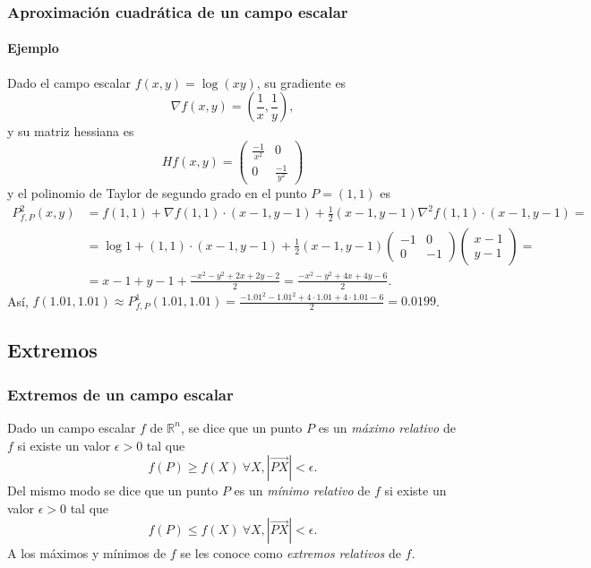 \begin{frame}
\frametitle{Aproximación cuadrática de un campo escalar}
\framesubtitle{Ejemplo}
Dado el campo escalar $f(x,y)=\log(xy)$, su gradiente es
\[
\nabla f(x,y) = \left(\frac{1}{x},\frac{1}{y}\right),
\]
y su matriz hessiana es 
\[
Hf(x,y) = \left(
\begin{array}{cc}
\frac{-1}{x^2} & 0\\
0 & \frac{-1}{y^2}
\end{array}
\right)
\]
y el polinomio de Taylor de segundo grado en el punto $P=(1,1)$ es
\begin{align*}
P^2_{f,P}(x,y) &= f(1,1) +\nabla f(1,1)\cdot (x-1,y-1) + \frac{1}{2}(x-1,y-1)\nabla^2f(1,1)\cdot(x-1,y-1)=\\
&= \log 1+(1,1)\cdot(x-1,y-1) + \frac{1}{2}(x-1,y-1)
\left(
\begin{array}{cc}
-1 & 0\\
0 & -1
\end{array}
\right)
\left(
\begin{array}{c}
x-1\\
y-1
\end{array}
\right)
= \\
&= x-1+y-1+\frac{-x^2-y^2+2x+2y-2}{2} = \frac{-x^2-y^2+4x+4y-6}{2}.
\end{align*}
Así, $f(1.01,1.01) \approx P^1_{f,P}(1.01,1.01) = \frac{-1.01^2-1.01^2+4\cdot 1.01+4\cdot 1.01-6}{2} = 0.0199$.
\end{frame}


\subsection{Extremos}
\begin{frame}
\frametitle{Extremos de un campo escalar}
\begin{definicion}
Dado un campo escalar $f$ de $\mathbb{R}^n$, se dice que un punto $P$ es un \emph{máximo relativo} de $f$ si existe un valor $\epsilon>0$ tal que
\[
f(P)\geq f(X)\ \forall X, |\vec{PX}|<\epsilon.
\] 
Del mismo modo se dice que un punto $P$ es un \emph{mínimo relativo} de $f$ si existe un valor $\epsilon>0$ tal que
\[
f(P)\leq f(X)\ \forall X, |\vec{PX}|<\epsilon.
\] 
A los máximos y mínimos de $f$ se les conoce como \emph{extremos relativos} de $f$.
\end{definicion}
\end{frame}


